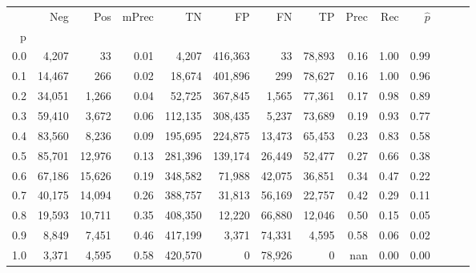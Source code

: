 \begin{tabular}{rrrrrrrrrrrrrr}
\toprule
{} &     Neg &     Pos & mPrec &       TN &       FP &      FN &      TP &  Prec &   Rec & $\hat{p}$ \\
p   &         &         &       &          &          &         &         &       &       &           \\
\midrule
0.0 &   4,207 &      33 &  0.01 &    4,207 &  416,363 &      33 &  78,893 &  0.16 &  1.00 &      0.99 \\
0.1 &  14,467 &     266 &  0.02 &   18,674 &  401,896 &     299 &  78,627 &  0.16 &  1.00 &      0.96 \\
0.2 &  34,051 &   1,266 &  0.04 &   52,725 &  367,845 &   1,565 &  77,361 &  0.17 &  0.98 &      0.89 \\
0.3 &  59,410 &   3,672 &  0.06 &  112,135 &  308,435 &   5,237 &  73,689 &  0.19 &  0.93 &      0.77 \\
0.4 &  83,560 &   8,236 &  0.09 &  195,695 &  224,875 &  13,473 &  65,453 &  0.23 &  0.83 &      0.58 \\
0.5 &  85,701 &  12,976 &  0.13 &  281,396 &  139,174 &  26,449 &  52,477 &  0.27 &  0.66 &      0.38 \\
0.6 &  67,186 &  15,626 &  0.19 &  348,582 &   71,988 &  42,075 &  36,851 &  0.34 &  0.47 &      0.22 \\
0.7 &  40,175 &  14,094 &  0.26 &  388,757 &   31,813 &  56,169 &  22,757 &  0.42 &  0.29 &      0.11 \\
0.8 &  19,593 &  10,711 &  0.35 &  408,350 &   12,220 &  66,880 &  12,046 &  0.50 &  0.15 &      0.05 \\
0.9 &   8,849 &   7,451 &  0.46 &  417,199 &    3,371 &  74,331 &   4,595 &  0.58 &  0.06 &      0.02 \\
1.0 &   3,371 &   4,595 &  0.58 &  420,570 &        0 &  78,926 &       0 &   nan &  0.00 &      0.00 \\
\bottomrule
\end{tabular}
